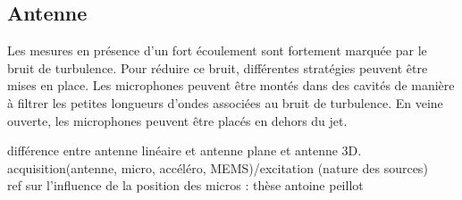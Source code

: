 \subsection{Antenne}
Les mesures en présence d'un fort écoulement sont fortement marquée par le bruit de turbulence. Pour réduire ce bruit, différentes stratégies peuvent être mises en place. Les microphones peuvent être montés dans des cavités de manière à filtrer les petites longueurs d'ondes associées au bruit de turbulence. En veine ouverte, les microphones peuvent être placés en dehors du jet.  


différence entre antenne linéaire et antenne plane et antenne 3D.\\

acquisition(antenne, micro, accéléro, MEMS)/excitation (nature des sources)\\

ref sur l'influence de la position des micros : thèse antoine peillot\\






